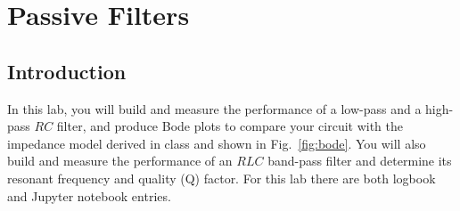 \chapter{Passive Filters}

\section{Introduction}

In this lab, you will build and measure the performance of a low-pass
and a high-pass $RC$ filter, and produce Bode plots to compare your
circuit with the impedance model derived in class and shown in
Fig.~\ref{fig:bode}.  You will also build and measure the performance
of an $RLC$ band-pass filter and determine its resonant frequency and
quality (Q) factor. For this lab there are both logbook and Jupyter
notebook entries.

